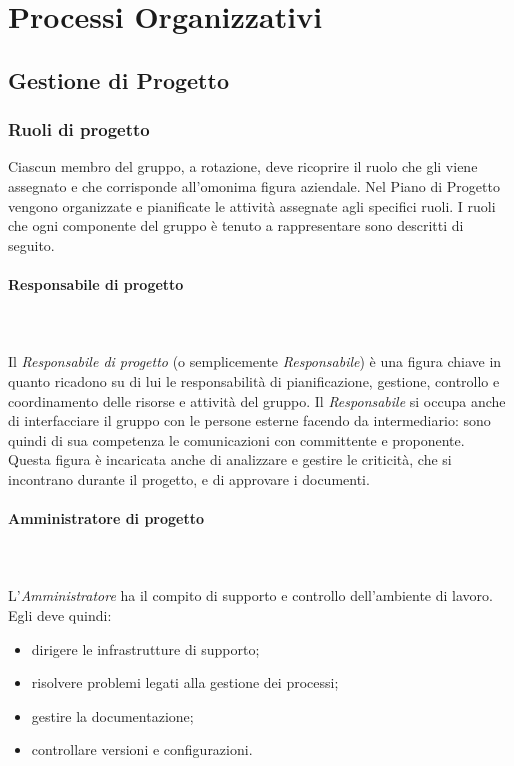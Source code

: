 \section{Processi Organizzativi}

\subsection{Gestione di Progetto}

\subsubsection{Ruoli di progetto}
Ciascun membro del gruppo, a rotazione, deve ricoprire il ruolo che gli viene assegnato e che corrisponde all'omonima figura aziendale. Nel Piano di Progetto vengono organizzate e pianificate le attività assegnate agli specifici ruoli. I ruoli che ogni componente del gruppo è tenuto a rappresentare sono descritti di seguito.

\paragraph{Responsabile di progetto}\mbox{} \\ \mbox{} \\
Il \textit{Responsabile di progetto} (o semplicemente \textit{Responsabile}) è una figura chiave in quanto ricadono su di lui le responsabilità di pianificazione, gestione, controllo e coordinamento delle risorse e attività del gruppo. Il \textit{Responsabile} si occupa anche di interfacciare il gruppo con le persone esterne facendo da intermediario: sono quindi di sua competenza le comunicazioni con committente e proponente.
Questa figura è incaricata anche di analizzare e gestire le criticità, che si incontrano durante il progetto, e di approvare i documenti.

\paragraph{Amministratore di progetto}\mbox{} \\ \mbox{} \\
L'\textit{Amministratore} ha il compito di supporto e controllo dell'ambiente di lavoro.
Egli deve quindi:
\begin{itemize}
	\item dirigere le infrastrutture di supporto;
	\item risolvere problemi legati alla gestione dei processi;
	\item gestire la documentazione;
	\item controllare versioni e configurazioni.
\end{itemize}

